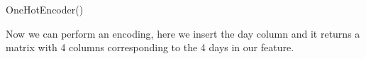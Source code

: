 \documentclass[letterpaper,10pt,english]{jupyterBook}
\begin{document}
\begin{sphinxVerbatim}[commandchars=\\\{\}]
  
\PYG{p}{[}\PYG{p}{[}\PYG{p}{]}\PYG{p}{]}
\end{sphinxVerbatim}

\begin{sphinxVerbatim}[commandchars=\\\{\}]
OneHotEncoder()
\end{sphinxVerbatim}

\sphinxAtStartPar
Now we can perform an encoding, here we insert the day column and it returns a matrix with 4 columns corresponding to the 4 days in our feature.

\begin{sphinxVerbatim}[commandchars=\\\{\}]
\PYG{p}{[}\PYG{p}{[}\PYG{p}{]}\PYG{p}{]}
\end{sphinxVerbatim}
\end{document}

